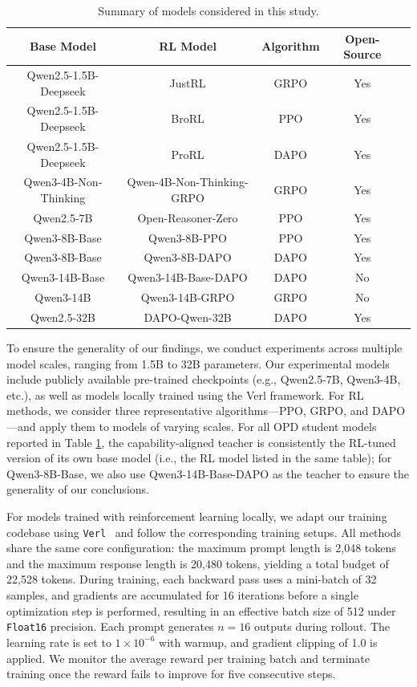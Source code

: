\documentclass{article}
\begin{document}
\begin{table}[h]
\centering
\caption{Summary of models considered in this study.}
\setlength{\tabcolsep}{4pt}
\label{mode_config}
\begin{tabular}{ccccc}
\toprule
\textbf{Base Model} & \textbf{RL Model} & \textbf{Algorithm} & \textbf{Open-Source} \\
\midrule
Qwen2.5-1.5B-Deepseek & JustRL \citep{he2025justrlscaling15bllm} & GRPO & Yes \\
Qwen2.5-1.5B-Deepseek & BroRL \citep{Hu2025BroRLSR} & PPO & Yes \\
Qwen2.5-1.5B-Deepseek & ProRL \citep{Liu2025ProRLPR} & DAPO & Yes \\
Qwen3-4B-Non-Thinking & Qwen-4B-Non-Thinking-GRPO & GRPO & Yes \\
Qwen2.5-7B & Open-Reasoner-Zero \citep{hu2025openreasonerzeroopensourceapproach} & PPO & Yes \\
Qwen3-8B-Base & Qwen3-8B-PPO \citep{cai2025predictability} & PPO & Yes \\
Qwen3-8B-Base & Qwen3-8B-DAPO \citep{cai2025predictability} & DAPO & Yes \\
Qwen3-14B-Base & Qwen3-14B-Base-DAPO & DAPO & No \\
Qwen3-14B & Qwen3-14B-GRPO & GRPO & No \\
Qwen2.5-32B & DAPO-Qwen-32B \citep{yu2025dapoopensourcellmreinforcement} & DAPO & Yes \\
\bottomrule
\end{tabular}
\end{table}

To ensure the generality of our findings, we conduct experiments across multiple model scales, ranging from 1.5B to 32B parameters. Our experimental models include publicly available pre-trained checkpoints (e.g., Qwen2.5-7B, Qwen3-4B, etc.), as well as models locally trained using the Verl framework. For RL methods, we consider three representative algorithms—PPO, GRPO, and DAPO—and apply them to models of varying scales. For all OPD student models reported in Table \ref{mode_config}, the capability-aligned teacher is consistently the RL-tuned version of its own base model (i.e., the RL model listed in the same table); for Qwen3-8B-Base, we also use Qwen3-14B-Base-DAPO as the teacher to ensure the generality of our conclusions.


For models trained with reinforcement learning locally, we adapt our training codebase using \texttt{Verl}~\citep{Sheng_2025} and follow the corresponding training setups. All methods share the same core configuration: the maximum prompt length is 2{,}048 tokens and the maximum response length is 20{,}480 tokens, yielding a total budget of 22{,}528 tokens. During training, each backward pass uses a mini-batch of 32 samples, and gradients are accumulated for 16 iterations before a single optimization step is performed, resulting in an effective batch size of 512 under \texttt{Float16} precision. Each prompt generates $n = 16$ outputs during rollout. The learning rate is set to $1 \times 10^{-6}$ with warmup, and gradient clipping of 1.0 is applied. We monitor the average reward per training batch and terminate training once the reward fails to improve for five consecutive steps.
\end{document}
